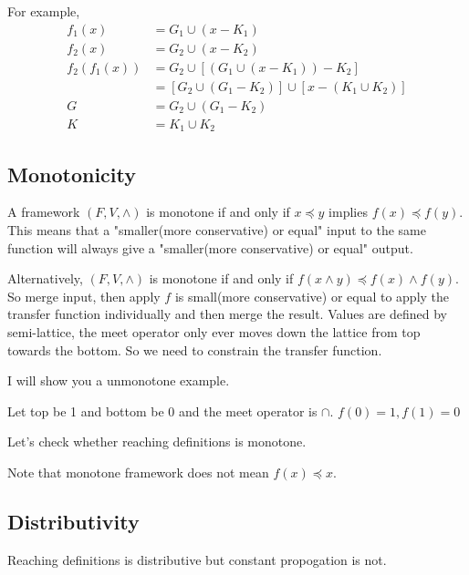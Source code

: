 For example, 
\begin{align*} 
    f_1(x) &= G_1 \cup (x - K_1)\\
    f_2(x) &= G_2 \cup (x - K_2) \\
    f_2(f_1(x)) &= G_2 \cup [(G_1 \cup (x - K_1)) - K_2] \\
    & = [G_2 \cup (G_1 - K_2)] \cup [x-(K_1 \cup K_2)] \\
    G &= G_2 \cup (G_1 - K_2) \\
    K &= K_1 \cup K_2
\end{align*}


\subsection{Monotonicity}


A framework \((F,V,\wedge)\) is monotone if and only if \(x \preceq y \) implies \(f(x) \preceq f(y)\). This means that
a "smaller(more conservative) or equal" input to the same function will always give a "smaller(more conservative)  or equal" output.



Alternatively, \((F,V,\wedge)\) is monotone if and only if \(  f(x \wedge y) \preceq f(x) \wedge f(y)\). So  merge input, then apply \(f\) is small(more conservative)  or equal to apply the transfer
function individually and then merge the result. Values are defined by semi-lattice, the meet operator only ever moves down the lattice from top towards the bottom. 
So we need to constrain the transfer function.

I will show you a unmonotone example.

Let top be 1 and bottom be 0 and the meet operator is \(\cap\). \(f(0) = 1, f(1) = 0\)


Let's check whether reaching definitions is monotone.


Note that monotone framework does not mean \(f(x) \preceq  x\).



\subsection{Distributivity}

Reaching definitions is distributive but constant propogation is not.





